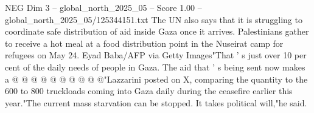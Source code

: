 \begin{textsample}{NEG Dim 3 – global\_north\_2025\_05 – Score 1.00 – global\_north\_2025\_05/125344151.txt}
The UN also says that it is struggling to coordinate safe distribution of aid inside Gaza once it arrives.
Palestinians gather to receive a hot meal at a food distribution point in the Nuseirat camp for refugees on May 24.
Eyad Baba/AFP via Getty Images"That ' s just over 10 per cent of the daily needs of people in Gaza.
The aid that ' s being sent now makes a @ @ @ @ @ @ @ @ @ @"Lazzarini posted on X, comparing the quantity to the 600 to 800 truckloads coming into Gaza daily during the ceasefire earlier this year."The current mass starvation can be stopped.
It takes political will,"he said.

\end{textsample}
